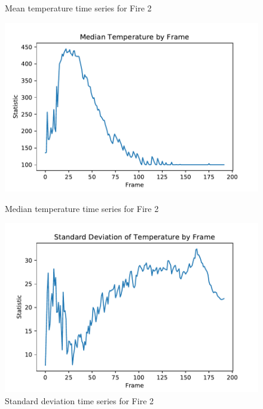\documentclass{article}
\begin{document}
\begin{figure}[ht]
\begin{minipage}[b]{0.5\linewidth}
    \caption{Mean temperature time series for Fire 2} 
    \vspace{4ex}
  \end{minipage} 
  \begin{minipage}[b]{0.5\linewidth}
    \centering
    \includegraphics[width=1.1\linewidth]{../plots/f2_mediantemp.pdf} 
    \caption{Median temperature time series for Fire 2} 
    \vspace{4ex}
  \end{minipage}%
  \begin{minipage}[b]{0.5\linewidth}
    \centering
    \includegraphics[width=1.1\linewidth]{../plots/f2_stdtemp.pdf} 
    \caption{Standard deviation time series for Fire 2} 
    \vspace{4ex}
  \end{minipage} 

\end{figure}
\end{document}
